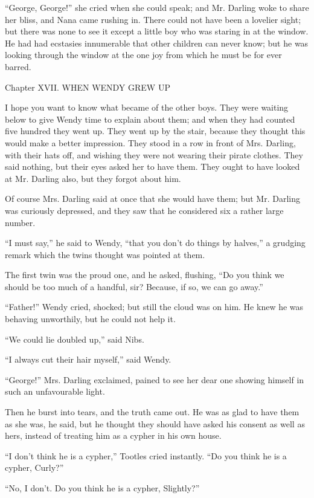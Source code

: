 ``George, George!'' she cried when she could speak; and Mr. Darling woke
to share her bliss, and Nana came rushing in. There could not have been
a lovelier sight; but there was none to see it except a little boy who
was staring in at the window. He had had ecstasies innumerable that
other children can never know; but he was looking through the window at
the one joy from which he must be for ever barred.




Chapter XVII.
WHEN WENDY GREW UP


I hope you want to know what became of the other boys. They were
waiting below to give Wendy time to explain about them; and when they
had counted five hundred they went up. They went up by the stair,
because they thought this would make a better impression. They stood in
a row in front of Mrs. Darling, with their hats off, and wishing they
were not wearing their pirate clothes. They said nothing, but their
eyes asked her to have them. They ought to have looked at Mr. Darling
also, but they forgot about him.

Of course Mrs. Darling said at once that she would have them; but Mr.
Darling was curiously depressed, and they saw that he considered six a
rather large number.

``I must say,'' he said to Wendy, ``that you don't do things by halves,'' a
grudging remark which the twins thought was pointed at them.

The first twin was the proud one, and he asked, flushing, ``Do you think
we should be too much of a handful, sir? Because, if so, we can go
away.''

``Father!'' Wendy cried, shocked; but still the cloud was on him. He knew
he was behaving unworthily, but he could not help it.

``We could lie doubled up,'' said Nibs.

``I always cut their hair myself,'' said Wendy.

``George!'' Mrs. Darling exclaimed, pained to see her dear one showing
himself in such an unfavourable light.

Then he burst into tears, and the truth came out. He was as glad to
have them as she was, he said, but he thought they should have asked
his consent as well as hers, instead of treating him as a cypher in his
own house.

``I don't think he is a cypher,'' Tootles cried instantly. ``Do you think
he is a cypher, Curly?''

``No, I don't. Do you think he is a cypher, Slightly?''

